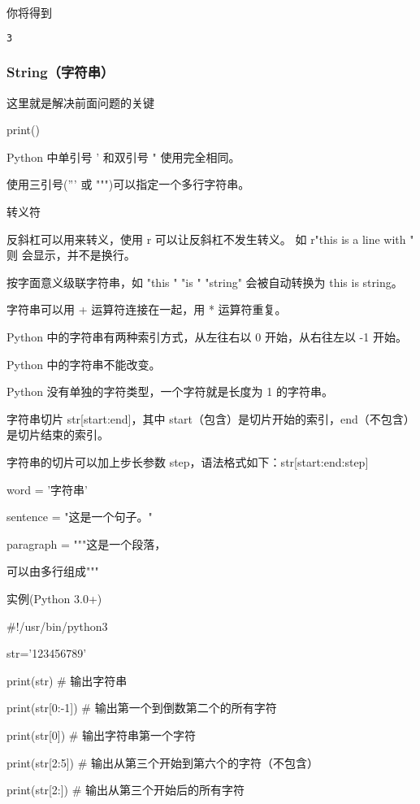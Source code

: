 你将得到

\begin{lstlisting}[language=bash]
3
\end{lstlisting}

\subsubsection{String（字符串）}

这里就是解决前面问题的关键

print()

Python 中单引号 ' 和双引号 " 使用完全相同。

使用三引号(''' 或 """)可以指定一个多行字符串。

转义符 \。

反斜杠可以用来转义，使用 r 可以让反斜杠不发生转义。 如 r"this is a line with \n" 则 \n 会显示，并不是换行。

按字面意义级联字符串，如 "this " "is " "string" 会被自动转换为 this is string。

字符串可以用 + 运算符连接在一起，用 * 运算符重复。

Python 中的字符串有两种索引方式，从左往右以 0 开始，从右往左以 -1 开始。

Python 中的字符串不能改变。

Python 没有单独的字符类型，一个字符就是长度为 1 的字符串。

字符串切片 str[start:end]，其中 start（包含）是切片开始的索引，end（不包含）是切片结束的索引。

字符串的切片可以加上步长参数 step，语法格式如下：str[start:end:step]

word = '字符串'

sentence = "这是一个句子。"

paragraph = """这是一个段落，

可以由多行组成"""

实例(Python 3.0+)

#!/usr/bin/python3
 
str='123456789'
 
print(str)                 # 输出字符串

print(str[0:-1])           # 输出第一个到倒数第二个的所有字符

print(str[0])              # 输出字符串第一个字符

print(str[2:5])            # 输出从第三个开始到第六个的字符（不包含）

print(str[2:])             # 输出从第三个开始后的所有字符

